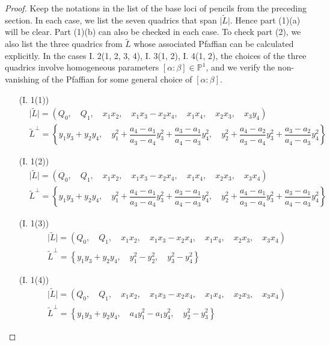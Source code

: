 \documentclass{amsart}[12pt]
\theoremstyle{definition}
\theoremstyle{remark}
\numberwithin{equation}{section}
\newcommand{\abs}[1]{\lvert#1\rvert}
\begin{document}
\begin{proof}
Keep the notations in the list of the base loci of pencils from the preceding section. In each case, we list the seven quadrics that span $\abs{\tilde{L}}$. Hence part (1)(a) will be clear. Part (1)(b) can also be checked in each case. To check part (2), we also list the three quadrics from $\tilde{L}$ whose associated Pfaffian can be calculated explicitly. In the cases I. 2(1, 2, 3, 4), I. 3(1, 2), I. 4(1, 2), the choices of the three quadrics involve homogeneous parameters $[\alpha: \beta] \in \mathbb{P}^1$, and we verify the non-vanishing of the Pfaffian for some general choice of $[\alpha: \beta]$. 

\begin{enumerate}

\item[(I. 1(1))]
\begin{align*}
& \abs{\tilde{L}} = (Q_0, \quad Q_1, \quad x_1x_2, \quad x_1x_3 - x_2x_4, \quad x_1x_4, \quad x_2x_3, \quad x_3y_4) \\ 
& \tilde{L}^{\perp} = \left\{y_1y_3 + y_2y_4, \quad y_1^2 + \dfrac{a_4 - a_1}{a_3 - a_4}y_3^2 + \dfrac{a_3 - a_1}{a_4 - a_3}y_4^2, \quad y_2^2 + \dfrac{a_4 - a_2}{a_3 - a_4}y_3^2 + \dfrac{a_3 - a_2}{a_4 - a_3}y_4^2 \right\} 
\end{align*} 

\item[(I. 1(2))]
\begin{align*}
& \abs{\tilde{L}} = (Q_0, \quad Q_1, \quad x_1x_2, \quad x_1x_3 - x_2x_4, \quad x_1x_4, \quad x_2x_3, \quad x_3x_4) \\ 
& \tilde{L}^{\perp} = \left\{y_1y_3 + y_2y_4, \quad y_1^2 + \dfrac{a_4 - a_1}{a_3 - a_4}y_3^2 + \dfrac{a_3 - a_1}{a_4 - a_3}y_4^2, \quad y_2^2 + \dfrac{a_4 - a_1}{a_3 - a_4}y_3^2 + \dfrac{a_3 - a_1}{a_4 - a_3}y_4^2 \right\} 
\end{align*} 

\item[(I. 1(3))]
\begin{align*}
& \abs{\tilde{L}} = (Q_0, \quad Q_1, \quad x_1x_2, \quad x_1x_3 - x_2x_4, \quad x_1x_4, \quad x_2x_3, \quad x_3x_4) \\ 
& \tilde{L}^{\perp} = \left\{y_1y_3 + y_2y_4, \quad y_1^2 - y_2^2, \quad y_3^2 - y_4^2 \right\}
\end{align*} 

\item[(I. 1(4))]
\begin{align*}
& \abs{\tilde{L}} = (Q_0, \quad Q_1, \quad x_1x_2, \quad x_1x_3 - x_2x_4, \quad x_1x_4, \quad x_2x_3, \quad x_3x_4) \\ 
& \tilde{L}^{\perp} = \left\{y_1y_3 + y_2y_4, \quad a_4y_1^2 - a_1y_4^2, \quad y_2^2 - y_3^2 \right\}
\end{align*} 


\end{enumerate}
\end{proof}
\end{document}
